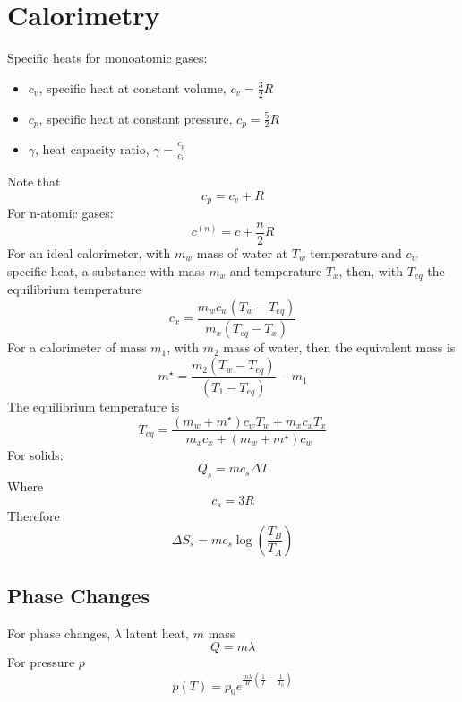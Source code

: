 \documentclass{aa}
\begin{document}
\section{Calorimetry}
Specific heats for monoatomic gases:
\begin{itemize}
\item $c_v$, specific heat at constant volume, $c_v=\frac{3}{2}R$
\item $c_p$, specific heat at constant pressure, $c_p=\frac{5}{2}R$
\item $\gamma$, heat capacity ratio, $\gamma=\frac{c_p}{c_v}$
\end{itemize}
Note that
\begin{equation}
	c_p=c_v+R
\end{equation}
For n-atomic gases:
\begin{equation*}
	c^{(n)}=c+\frac{n}{2}R
\end{equation*}
For an ideal calorimeter, with $m_{w}$ mass of water at $T_w$ temperature and $c_w$ specific heat, a substance with mass $m_x$ and temperature $T_x$, then, with $T_{eq}$ the equilibrium temperature
\begin{equation}
	c_x=\frac{m_wc_w\left( T_{w}-T_{eq} \right)}{m_x\left( T_{eq}-T_{x} \right)}
\end{equation}
For a calorimeter of mass $m_1$, with $m_2$ mass of water, then the equivalent mass is 
\begin{equation}
	m^\star=\frac{m_2\left( T_w-T_{eq} \right)}{\left( T_1-T_{eq} \right)}-m_1
\end{equation}
The equilibrium temperature is
\begin{equation}
	T_{eq}=\frac{\left( m_w+m^\star \right)c_wT_w+m_xc_xT_x}{m_xc_x+\left( m_w+m^\star \right)c_w}
\end{equation}
For solids:
\begin{equation}
	Q_s=mc_s\Delta T
\end{equation}
Where
\begin{equation}
	c_s=3R
	\label{eq:dulong}
\end{equation}
Therefore
\begin{equation}
	\Delta S_s= mc_s\log\left( \frac{T_B}{T_A} \right)
\end{equation}
\subsection{Phase Changes}
For phase changes, $\lambda$ latent heat, $m$ mass
\begin{equation}
	Q=m\lambda
\end{equation}
For pressure $p$
\begin{equation}
	p(T)=p_0e^{\frac{m\lambda}{R}\left( \frac{1}{T}-\frac{1}{T_0} \right)}
\end{equation}
\end{document}
